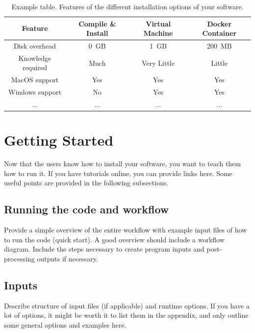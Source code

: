 \documentclass{article}
\begin{document}
\begin{table}[htb]
  \center
  \begin{tabular}{|c|ccc|}
    \hline
    Feature & Compile \& Install & Virtual Machine & Docker Container \\
    \hline
    Disk overhead           & 0~GB  & 1~GB        & 200~MB \\
    Knowledge required      & Much  & Very Little & Little \\
    MacOS support           & Yes   & Yes         & Yes    \\
    Windows support         & No    & Yes         & Yes    \\
    ...                     & ...   & ...         & ... \\ \hline
  \end{tabular}
  \caption{Example table. Features of the different installation options of your software.}
  \label{tab:install-options}
\end{table}

\section{Getting Started}

Now that the users know how to install your software, you want to teach them how to run it. If you have tutorials online, you can provide links here. 
Some useful points are provided in the following subsections. 

\subsection{Running the code and workflow} 
Provide a simple overview of the entire workflow with example input files of how to run the code (quick start).
A good overview should include a workflow diagram. Include the steps necessary to create program inputs and post-processing outputs if necessary.

\subsection{Inputs} 
Describe structure of input files (if applicable) and runtime options.
If you have a lot of options, it might be worth it to list them in the appendix, and only outline some general options and examples here. 
\end{document}
